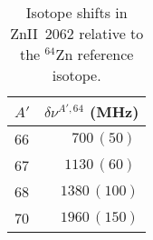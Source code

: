 \documentclass[twocolumn,pra,showpacs]{revtex4}
\begin{document}
\begin{table}[h]
\caption{\label{tab:2062} Isotope shifts in ZnII~2062 relative to the $^{64}$Zn reference isotope.}
\begin{tabular}{lr}
$A'$ & $\delta\nu^{A', 64}$ (MHz) \\
\hline
66 & $700\,(50)\ $ \\
67 & $1130\,(60)\ $ \\
68 & $1380\,(100)$ \\
70 & $1960\,(150)$ \\
\end{tabular}
\end{table}


\end{document}
